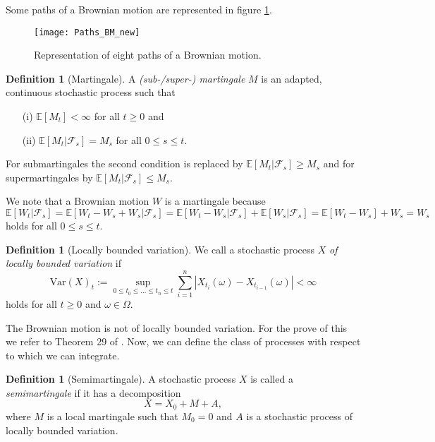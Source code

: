 \documentclass[11pt,titlepage]{article}
\newcommand{\E}{\mathbb{E}} %
\newcommand{\abs}[1]{{\left| #1 \right|}}
\theoremstyle{definition}
\newtheorem{definition}[theorem]{Definition}
\theoremstyle{remark}
\begin{document}
	Some paths of a Brownian motion are represented in figure \ref{Abb Pfade Brownsche Bewegung}.
	
	\begin{figure}[h!]
		\centering
		\texttt{[image: Paths\_BM\_new]}
		\caption{Representation of eight paths of a Brownian motion.}
		\label{Abb Pfade Brownsche Bewegung}
	\end{figure}
	
	\begin{definition}[Martingale]
		A \textsl{(sub-/super-) martingale} $M$ is an adapted, continuous stochastic process such that
		\begin{itemize}
			\item[(i)] $\E[M_t]<\infty$ for all $t\geq 0$ and
			\item[(ii)] $\E[M_t\vert\mathcal{F}_s] = M_s$ for all $0\leq s\leq t$.
		\end{itemize}
		For submartingales the second condition is replaced by $\E[M_t\vert \mathcal{F}_s]\geq M_s$ and for supermartingales by $\E[M_t\vert \mathcal{F}_s]\leq M_s$.
	\end{definition}
	
	We note that a Brownian motion $W$ is a martingale because
	\[\E[W_t\vert\mathcal{F}_s] = \E[W_t - W_s +W_s \vert\mathcal{F}_s] = \E[W_t - W_s\vert\mathcal{F}_s] + \E[W_s\vert\mathcal{F}_s]= \E[W_t - W_s] + W_s = W_s\]
	holds for all $0\leq s\leq t$.
	
	\clearpage
	\begin{definition}[Locally bounded variation]
		We call a stochastic process $X$ \textsl{of locally bounded variation} if
		\[\text{Var}(X)_t := \sup_{0\leq t_0\leq\ldots\leq t_n\leq t} \sum_{i=1}^n \abs{X_{t_i}(\omega)- X_{t_{i-1}}(\omega)}<\infty\]
		holds for all $t\geq 0$ and $\omega\in\Omega$.
	\end{definition}
	
	The Brownian motion is not of locally bounded variation. For the prove of this we refer to Theorem 29 of \cite{Protter2004}. Now, we can define the class of processes with respect to which we can integrate.
	
	\begin{definition}[Semimartingale]
		A stochastic process $X$ is called a \textsl{semimartingale} if it has a decomposition
		\[X = X_0 + M + A,\]
		where $M$ is a local martingale such that $M_0 = 0$ and $A$ is a stochastic process of locally bounded variation.
	\end{definition}
	
\end{document}
